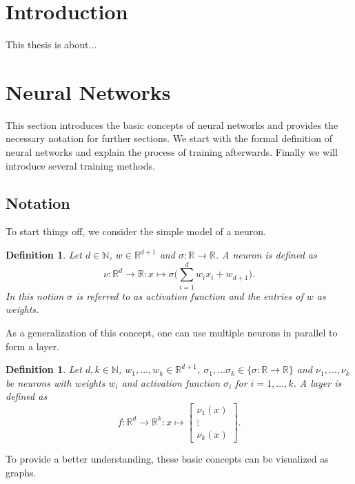 \documentclass[11pt, a4paper]{article}
\newtheorem{definition}[theorem]{Definition}
\newcommand{\N}{\mathds{N}}
\newcommand{\R}{\mathds{R}}
\begin{document}
\tableofcontents
\thispagestyle{empty}

\pagebreak
\section{Introduction}

This thesis is about...

\pagebreak
\section{Neural Networks}

This section introduces the basic concepts of neural networks and provides the necessary notation for further sections. We start with the formal definition of neural networks and explain the process of training afterwards. Finally we will introduce several training methods.

\subsection{Notation} \label{sec:notation}

To start things off, we consider the simple model of a neuron. 

\begin{definition}
Let $d \in \N$, $w \in \R^{d+1}$ and $\sigma: \R \to \R$. A neuron is defined as
\[ \nu : \R^{d} \to \R : x \mapsto \sigma \Big ( \sum_{i=1}^{d} w_ix_i + w_{d+1}\Big ).\]
In this notion $\sigma$ is referred to as activation function and the entries of $w$ as weights.
\end{definition}

As a generalization of this concept, one can use multiple neurons in parallel to form a layer.

\begin{definition}  \label{def:layer}
Let $d, k \in \N$, $w_1, \dots, w_k \in \R^{d+1}$, $\sigma_1, \dots \sigma_k \in \{ \sigma : \R \to \R \}$ and $\nu_1, \dots, \nu_k$ be neurons with weights $w_i$ and activation function $\sigma_i$ for $i=1, \dots, k$. A layer is defined as
\[ f : \R^d \to \R^k : x \mapsto \begin{bmatrix} \nu_1(x) \\ \vdots \\ \nu_k(x) \end{bmatrix}. \]
\end{definition}

To provide a better understanding, these basic concepts can be visualized as graphs. \\
\end{document}
